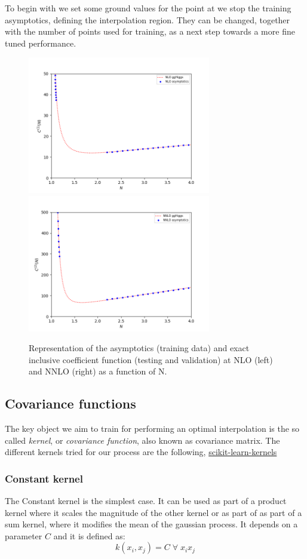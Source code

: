 \documentclass[12pt]{article}
\begin{document}
To begin with we set some ground values for the point at we stop the training asymptotics, defining the interpolation region. They can be changed, together with the number of points used for training, as a next step towards a more fine tuned performance.
\begin{figure}
	\centering
	{\includegraphics[width = 8cm]{plots/nlo_asymptotics.png}}
	\qquad
	{\includegraphics[width = 8cm]{plots/nnlo_asymptotics.png}}
	\caption{Representation of the asymptotics (training data) and exact inclusive coefficient function (testing and validation) at NLO (left) and NNLO (right) as a function of N.}
	\label{asymptotics_gp}
\end{figure}

\newpage

\subsection{Covariance functions}
The key object we aim to train for performing an optimal interpolation is the so called \textit{kernel}, or \textit{covariance function}, also known as covariance matrix.
The different kernels tried for our process are the following, \href{https://scikit-learn.org/stable/modules/classes.html#module-sklearn.gaussian_process}{scikit-learn-kernels}

\subsubsection{Constant kernel}
The Constant kernel is the simplest case. It can be used as part of a product kernel where it scales the magnitude of the other kernel or as part of as part of a sum kernel, where it modifies the mean of the gaussian process. It depends on a parameter $C$ and it is defined as:
\begin{equation}
k(x_{i}, x_{j}) = C \; \forall \; x_{i} x_{j}
\end{equation}
\end{document}
